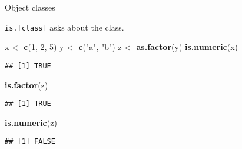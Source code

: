 \documentclass[ignorenonframetext,]{beamer}
\newenvironment{Shaded}{\begin{snugshade}}{\end{snugshade}}
\newcommand{\DecValTok}[1]{\textcolor[rgb]{0.00,0.00,0.81}{#1}}
\newcommand{\KeywordTok}[1]{\textcolor[rgb]{0.13,0.29,0.53}{\textbf{#1}}}
\newcommand{\NormalTok}[1]{#1}
\newcommand{\StringTok}[1]{\textcolor[rgb]{0.31,0.60,0.02}{#1}}
\begin{document}
\begin{frame}[fragile]{Object classes}
\protect\hypertarget{object-classes-1}{}

\texttt{is.{[}class{]}} asks about the class.

\begin{Shaded}
\begin{Highlighting}[]
\NormalTok{x <-}\StringTok{ }\KeywordTok{c}\NormalTok{(}\DecValTok{1}\NormalTok{, }\DecValTok{2}\NormalTok{, }\DecValTok{5}\NormalTok{)}
\NormalTok{y <-}\StringTok{ }\KeywordTok{c}\NormalTok{(}\StringTok{"a"}\NormalTok{, }\StringTok{"b"}\NormalTok{)}
\NormalTok{z <-}\StringTok{ }\KeywordTok{as.factor}\NormalTok{(y)}
\KeywordTok{is.numeric}\NormalTok{(x)}
\end{Highlighting}
\end{Shaded}

\begin{verbatim}
## [1] TRUE
\end{verbatim}

\begin{Shaded}
\begin{Highlighting}[]
\KeywordTok{is.factor}\NormalTok{(z)}
\end{Highlighting}
\end{Shaded}

\begin{verbatim}
## [1] TRUE
\end{verbatim}

\begin{Shaded}
\begin{Highlighting}[]
\KeywordTok{is.numeric}\NormalTok{(z)}
\end{Highlighting}
\end{Shaded}

\begin{verbatim}
## [1] FALSE
\end{verbatim}

\end{frame}
\end{document}
